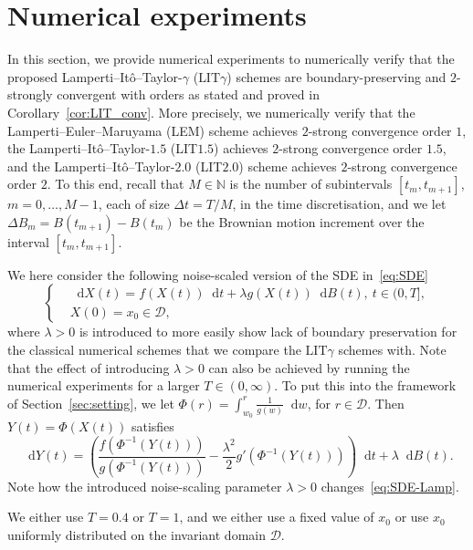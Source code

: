 \documentclass[11pt]{amsart}
\newcommand*\diff{\mathop{}\!\mathrm{d}}
\newcommand{\D}{\mathcal{D}}
\newcommand{\LIT}{\textrm{LIT}}
\begin{document}
{\section{Numerical experiments}\label{sec:numExp}In this section, we provide numerical experiments to numerically verify that the proposed Lamperti--Itô--Taylor-$\gamma$ ($\LIT \gamma$) schemes are boundary-preserving and $2$-strongly convergent with orders as stated and proved in Corollary~\ref{cor:LIT_conv}. More precisely, we numerically verify that the Lamperti--Euler--Maruyama (LEM) scheme achieves $2$-strong convergence order $1$, the Lamperti--Itô--Taylor-$1.5$ (LIT$1.5$) achieves $2$-strong convergence order $1.5$, and the Lamperti--Itô--Taylor-$2.0$ (LIT$2.0$) scheme achieves $2$-strong convergence order $2$. To this end, recall that $M \in \mathbb{N}$ is the number of subintervals $[t_{m},t_{m+1}]$, $m=0,\ldots,M-1$, each of size $\Delta t = T/M$, in the time discretisation, and we let $\Delta B_{m} = B(t_{m+1}) - B(t_{m})$ be the Brownian motion increment over the interval $[t_{m},t_{m+1}]$.

We here consider the following noise-scaled version of the SDE in~\eqref{eq:SDE}
\begin{equation*}
\left\lbrace
\begin{aligned}
& \diff X(t) = f(X(t)) \diff t + \lambda g(X(t)) \diff B(t),\ t \in (0,T], \\ 
& X(0) = x_{0} \in \D,
\end{aligned}
\right.
\end{equation*}
where $\lambda>0$ is introduced to more easily show lack of boundary preservation for the classical numerical schemes that we compare the $\LIT \gamma$ schemes with. Note that the effect of introducing $\lambda>0$ can also be achieved by running the numerical experiments for a larger $T \in (0,\infty)$. To put this into the framework of Section~\ref{sec:setting}, we let $\Phi(r) = \int_{w_{0}}^{r} \frac{1}{g(w)} \diff w$, for $r \in \D$. Then $Y(t) = \Phi(X(t))$ satisfies
\begin{equation*}
\diff Y(t) = \left( \frac{f(\Phi^{-1}(Y(t)))}{g(\Phi^{-1}(Y(t)))} - \frac{\lambda^{2}}{2} g'(\Phi^{-1}(Y(t))) \right) \diff t + \lambda \diff B(t).
\end{equation*}
Note how the introduced noise-scaling parameter $\lambda>0$ changes~\eqref{eq:SDE-Lamp}.

We either use $T = 0.4$ or $T = 1$, and we either use a fixed value of $x_{0}$ or use $x_{0}$ uniformly distributed on the invariant domain $\D$.

}
\end{document}
